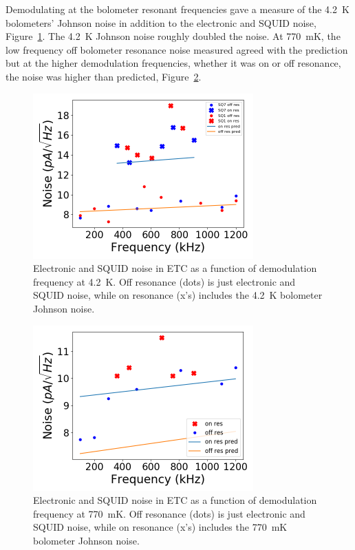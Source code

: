 Demodulating at the bolometer resonant frequencies gave a measure of the 4.2~K bolometers' Johnson noise in addition to the electronic and \ac{SQUID} noise, Figure~\ref{fig:dark_squid_noise}. 
The 4.2~K Johnson noise roughly doubled the noise.
At 770~mK, the low frequency off bolometer resonance noise measured agreed with the prediction but at the higher demodulation frequencies, whether it was on or off resonance, the noise was higher than predicted, Figure~\ref{fig:770mK_squid_noise}. 



\begin{figure}[ht!]
\begin{center}
\includegraphics[height=2.5in]{figures/squid_plus_electronic_noise.png}
\caption{Electronic and \ac{SQUID} noise in \ac{ETC} as a function of demodulation frequency at 4.2~K. Off resonance (dots) is just electronic and \ac{SQUID} noise, while on resonance (x's) includes the 4.2~K bolometer Johnson noise. 
\label{fig:dark_squid_noise} }
\end{center}
\end{figure}

\begin{figure}[ht!]
\begin{center}
\includegraphics[height=2.5in]{figures/squid_noise_770mK.png}
\caption{Electronic and \ac{SQUID} noise in \ac{ETC} as a function of demodulation frequency at 770~mK. Off resonance (dots) is just electronic and \ac{SQUID} noise, while on resonance (x's) includes the 770~mK bolometer Johnson noise. 
\label{fig:770mK_squid_noise} }
\end{center}
\end{figure}

